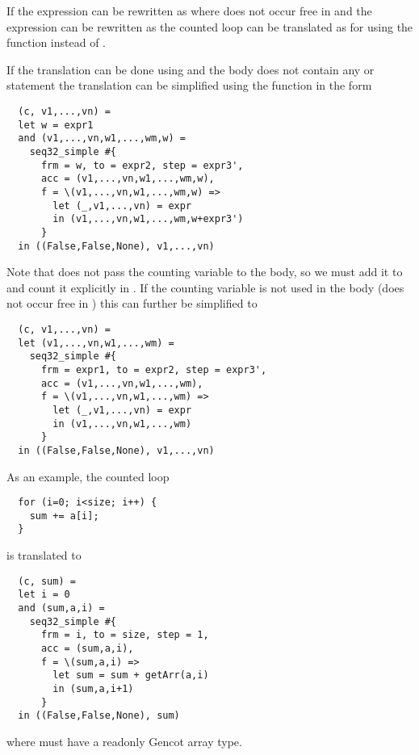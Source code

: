 If the expression  can be rewritten as  where  does not occur free in 
and the expression  can be rewritten as 
the counted loop can be translated as for  using the function  instead of .

If the translation can be done using  and the body does not contain any  or  statement 
the translation can be simplified using the function  in the form
\begin{verbatim}
  (c, v1,...,vn) = 
  let w = expr1
  and (v1,...,vn,w1,...,wm,w) = 
    seq32_simple #{
      frm = w, to = expr2, step = expr3', 
      acc = (v1,...,vn,w1,...,wm,w), 
      f = \(v1,...,vn,w1,...,wm,w) => 
        let (_,v1,...,vn) = expr
        in (v1,...,vn,w1,...,wm,w+expr3')
      }
  in ((False,False,None), v1,...,vn)
\end{verbatim}
Note that  does not pass the counting variable  to the body, so we must add it to 
and count it explicitly in .
If the counting variable  is not used in the body (does not occur free in ) this can further be simplified to
\begin{verbatim}
  (c, v1,...,vn) = 
  let (v1,...,vn,w1,...,wm) = 
    seq32_simple #{
      frm = expr1, to = expr2, step = expr3', 
      acc = (v1,...,vn,w1,...,wm), 
      f = \(v1,...,vn,w1,...,wm) => 
        let (_,v1,...,vn) = expr
        in (v1,...,vn,w1,...,wm)
      }
  in ((False,False,None), v1,...,vn)
\end{verbatim}

As an example, the counted loop
\begin{verbatim}
  for (i=0; i<size; i++) { 
    sum += a[i];
  }
\end{verbatim}
is translated to
\begin{verbatim}
  (c, sum) = 
  let i = 0
  and (sum,a,i) = 
    seq32_simple #{
      frm = i, to = size, step = 1, 
      acc = (sum,a,i), 
      f = \(sum,a,i) => 
        let sum = sum + getArr(a,i)
        in (sum,a,i+1)
      }
  in ((False,False,None), sum)
\end{verbatim}
where  must have a readonly Gencot array type. 

